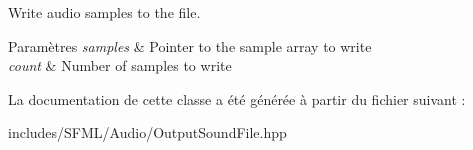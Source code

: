 Write audio samples to the file. 


\begin{DoxyParams}{Paramètres}
{\em samples} & Pointer to the sample array to write \\
\hline
{\em count} & Number of samples to write \\
\hline
\end{DoxyParams}


La documentation de cette classe a été générée à partir du fichier suivant \+:\begin{DoxyCompactItemize}
\item 
includes/\+S\+F\+M\+L/\+Audio/Output\+Sound\+File.\+hpp\end{DoxyCompactItemize}
